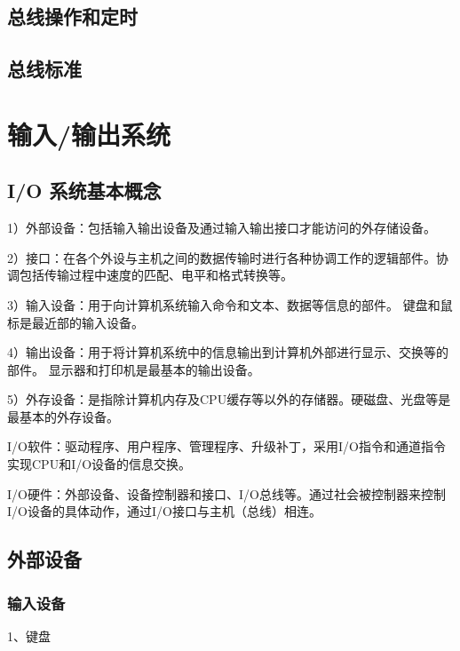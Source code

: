 \documentclass{ctexart}
\begin{document}
\subsection{总线操作和定时}

\subsection{总线标准}

















\section{输入/输出系统}
\subsection{ I/O 系统基本概念}
1）外部设备：包括输入输出设备及通过输入输出接口才能访问的外存储设备。

2）接口：在各个外设与主机之间的数据传输时进行各种协调工作的逻辑部件。协调包括传输过程中速度的匹配、电平和格式转换等。

3）输入设备：用于向计算机系统输入命令和文本、数据等信息的部件。
键盘和鼠标是最近部的输入设备。

4）输出设备：用于将计算机系统中的信息输出到计算机外部进行显示、交换等的部件。
显示器和打印机是最基本的输出设备。

5）外存设备：是指除计算机内存及CPU缓存等以外的存储器。硬磁盘、光盘等是最基本的外存设备。

I/O软件：驱动程序、用户程序、管理程序、升级补丁，采用I/O指令和通道指令实现CPU和I/O设备的信息交换。

I/O硬件：外部设备、设备控制器和接口、I/O总线等。通过社会被控制器来控制I/O设备的具体动作，通过I/O接口与主机（总线）相连。

\subsection{外部设备}

\subsubsection{输入设备}
1、键盘
\end{document}
